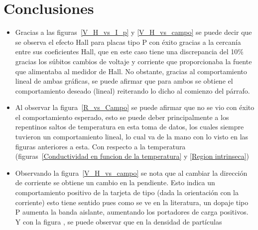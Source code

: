\documentclass[%
 reprint,
 amsmath,amssymb,
 aps,
]{revtex4-1}
\begin{document}
\section{Conclusiones}
\begin{itemize}
    \item Gracias a las figuras~\ref{V_H_vs_I_p} y \ref{V_H_vs_campo} se puede decir que se observa el efecto Hall para placas tipo P con éxito gracias a la cercanía entre sus coeficientes Hall, que en este caso tiene una discrepancia del 10\% gracias los súbitos cambios de voltaje y corriente que proporcionaba la fuente que alimentaba al medidor de Hall. No obstante, gracias al comportamiento lineal de ambas gráficas, se puede afirmar que para ambos se obtiene el comportamiento deseado (lineal) reiterando lo dicho al comienzo del párrafo.
    \item Al observar la figura~\ref{R_vs_Campo} se puede afirmar que no se vio con éxito el comportamiento esperado, esto se puede deber principalmente a los repentinos saltos de temperatura en esta toma de datos, los cuales siempre tuvieron un comportamiento lineal, lo cual va de la mano con lo visto en las figuras anteriores a esta. Con respecto a la temperatura (figuras~\ref{Conductividad en funcion de la temperatura} y \ref{Region intrinseca}) 
    \item Observando la figura~\ref{V_H_vs_campo} se nota que al cambiar la dirección de corriente se obtiene un cambio en la pendiente. Esto indica un comportamiento positivo de la tarjeta de tipo (dada la orientación con la corriente) esto tiene sentido pues como se ve en la literatura, un dopaje tipo P aumenta la banda aislante, aumentando los portadores de carga positivos. Y con la figura , se puede observar que en la densidad de partículas
\end{itemize}
\end{document}
